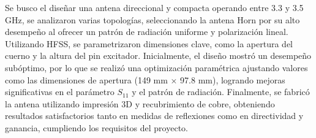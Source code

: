 \documentclass[
	spanish, %
	letterpaper, oneside
]{article}
\begin{document}
\templatePortrait

\templatePagecfg

\begin{abstractd}
	Se busco el diseñar una antena direccional y compacta operando entre 3.3 y 3.5 GHz, se analizaron varias topologías, seleccionando la antena Horn por su alto desempeño al ofrecer un patrón de radiación uniforme y polarización lineal. Utilizando HFSS, se parametrizaron dimensiones clave, como la apertura del cuerno y la altura del pin excitador. Inicialmente, el diseño mostró un desempeño subóptimo, por lo que se realizó una optimización paramétrica ajustando valores como las dimensiones de apertura (149 mm × 97.8 mm), logrando mejoras significativas en el parámetro $S_{11}$ y el patrón de radiación. Finalmente, se fabricó la antena utilizando impresión 3D y recubrimiento de cobre, obteniendo resultados satisfactorios tanto en medidas de reflexiones como en directividad y ganancia, cumpliendo los requisitos del proyecto.
\end{abstractd}

\templateIndex

\templateFinalcfg



\end{document}
